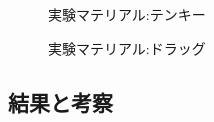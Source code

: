 \begin{figure}[htbp]
  \begin{minipage}{0.5\hsize}
    \begin{center}
    \end{center}
    \caption{実験マテリアル:テンキー}
    \label{fig:lyspect}
  \end{minipage}
  \begin{minipage}{0.5\hsize}
    \begin{center}
    \end{center}
    \caption{実験マテリアル:ドラッグ}
    \label{fig:lyspect}
  \end{minipage}
\end{figure}


\subsection{結果と考察}